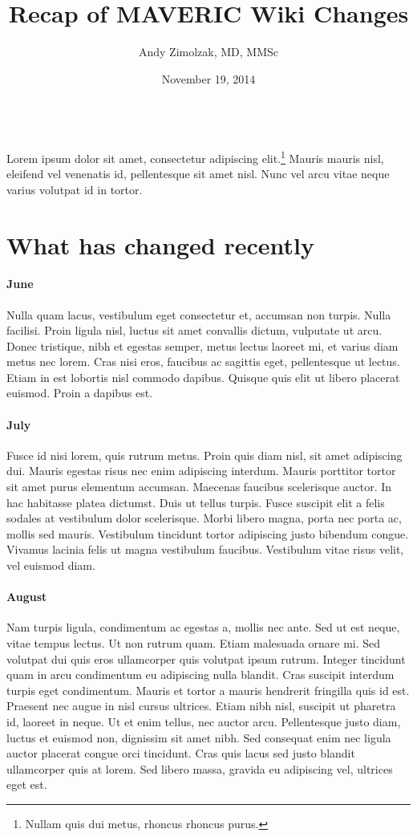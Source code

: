 \documentclass{tufte-handout}
\title{Recap of MAVERIC Wiki Changes}
\author{Andy Zimolzak, MD, MMSc}
\date{November 19, 2014}
\begin{document}
\maketitle

~\\

Lorem ipsum dolor sit amet, consectetur adipiscing
elit.\footnote{Nullam quis dui metus, rhoncus rhoncus purus.} Mauris
mauris nisl, eleifend vel venenatis id, pellentesque sit amet nisl.
Nunc vel arcu vitae neque varius volutpat id in tortor.

\section{What has changed recently}

\paragraph{June}  Nulla quam lacus, vestibulum eget
consectetur et, accumsan non turpis. Nulla facilisi. Proin ligula
nisl, luctus sit amet convallis dictum, vulputate ut arcu. Donec
tristique, nibh et egestas semper, metus lectus laoreet mi, et varius
diam metus nec lorem. Cras nisi eros, faucibus ac sagittis eget,
pellentesque ut lectus. Etiam in est lobortis nisl commodo dapibus.
Quisque quis elit ut libero placerat euismod. Proin a dapibus est.

\paragraph{July} Fusce id nisi lorem, quis rutrum metus. 
Proin quis diam nisl, sit amet adipiscing dui. Mauris egestas risus
nec enim adipiscing interdum. Mauris porttitor tortor sit amet purus
elementum accumsan. Maecenas faucibus scelerisque auctor. In hac
habitasse platea dictumst. Duis ut tellus turpis. Fusce suscipit elit
a felis sodales at vestibulum dolor scelerisque. Morbi libero magna,
porta nec porta ac, mollis sed mauris. Vestibulum tincidunt tortor
adipiscing justo bibendum congue. Vivamus lacinia felis ut magna
vestibulum faucibus. Vestibulum vitae risus velit, vel euismod diam.

\paragraph{August} Nam turpis ligula, condimentum ac egestas a, 
mollis nec ante. Sed ut est neque, vitae tempus lectus. Ut non rutrum
quam. Etiam malesuada ornare mi. Sed volutpat dui quis eros
ullamcorper quis volutpat ipsum rutrum. Integer tincidunt quam in arcu
condimentum eu adipiscing nulla blandit. Cras suscipit interdum turpis
eget condimentum. Mauris et tortor a mauris hendrerit fringilla quis
id est. Praesent nec augue in nisl cursus ultrices. Etiam nibh nisl,
suscipit ut pharetra id, laoreet in neque. Ut et enim tellus, nec
auctor arcu. Pellentesque justo diam, luctus et euismod non, dignissim
sit amet nibh. Sed consequat enim nec ligula auctor placerat congue
orci tincidunt. Cras quis lacus sed justo blandit ullamcorper quis at
lorem. Sed libero massa, gravida eu adipiscing vel, ultrices eget est.
\end{document}

